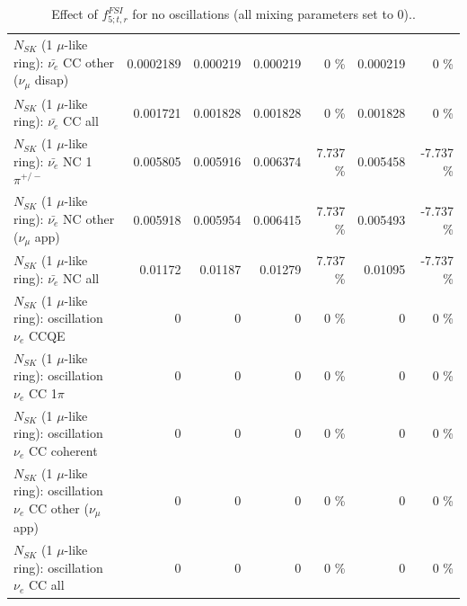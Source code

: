 \begin{table}
\begin{tabular}{| l | r | r | r  r | r  r |}
          $N_{SK}$ (1 $\mu$-like ring): $\bar{\nu_e}$ CC other ($\nu_\mu$ disap) &       0.0002189 &        0.000219 &        0.000219 &        0 \%  &        0.000219 &        0 \%  \\ 
                            $N_{SK}$ (1 $\mu$-like ring): $\bar{\nu_{e}}$ CC all &        0.001721 &        0.001828 &        0.001828 &        0 \%  &        0.001828 &        0 \%  \\ 
\hline
                     $N_{SK}$ (1 $\mu$-like ring): $\bar{\nu_e}$ NC 1$\pi^{+/-}$ &        0.005805 &        0.005916 &        0.006374 &    7.737 \%  &        0.005458 &   -7.737 \%  \\ 
            $N_{SK}$ (1 $\mu$-like ring): $\bar{\nu_e}$ NC other ($\nu_\mu$ app) &        0.005918 &        0.005954 &        0.006415 &    7.737 \%  &        0.005493 &   -7.737 \%  \\ 
                            $N_{SK}$ (1 $\mu$-like ring): $\bar{\nu_{e}}$ NC all &         0.01172 &         0.01187 &         0.01279 &    7.737 \%  &         0.01095 &   -7.737 \%  \\ 
\hline
\hline
\hline
                          $N_{SK}$ (1 $\mu$-like ring): oscillation $\nu_e$ CCQE &               0 &               0 &               0 &        0 \%  &               0 &        0 \%  \\ 
                     $N_{SK}$ (1 $\mu$-like ring): oscillation $\nu_e$ CC 1$\pi$ &               0 &               0 &               0 &        0 \%  &               0 &        0 \%  \\ 
                   $N_{SK}$ (1 $\mu$-like ring): oscillation $\nu_e$ CC coherent &               0 &               0 &               0 &        0 \%  &               0 &        0 \%  \\ 
      $N_{SK}$ (1 $\mu$-like ring): oscillation $\nu_e$ CC other ($\nu_\mu$ app) &               0 &               0 &               0 &        0 \%  &               0 &        0 \%  \\ 
                       $N_{SK}$ (1 $\mu$-like ring): oscillation $\nu_e$  CC all &               0 &               0 &               0 &        0 \%  &               0 &        0 \%  \\ 
\hline
\hline
\end{tabular}
\caption{ Effect of $f_{5; t, r}^{FSI}$ for no oscillations (all mixing parameters set to 0).. }
\label{tab:num_fsi_005_1RmuT_3f_osc_t13:0_spectralreco_spectraltrue}
\end{table}
\clearpage
